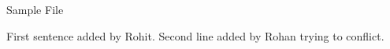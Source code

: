 \documentclass{article}
\begin{document}
\centerline{\sc \large Sample File}
\vspace{.5pc}
\centerline{\sc }
\vspace{2pc}

First sentence added by Rohit.
Second line added by Rohan trying to conflict.
\end{document}
